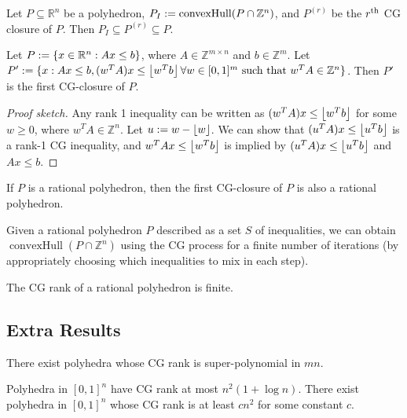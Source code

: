 \documentclass[a4paper,12pt,fleqn]{article}
\DeclareMathOperator{\convexHull}{convexHull}
\begin{document}
\begin{lemma}
Let $P \subseteq \mathbb{R}^n$ be a polyhedron,
$P_I \defeq \convexHull(P \cap \mathbb{Z}^n)$,
and $P^{(r)}$ be the $r^{\textrm{th}}$ CG closure of $P$.
Then $P_I \subseteq P^{(r)} \subseteq P$.
\end{lemma}

\begin{lemma}
Let $P := \{x \in \mathbb{R}^n: Ax \le b\}$,
where $A \in \mathbb{Z}^{m \times n}$ and $b \in \mathbb{Z}^m$.
Let $P' := \{x: Ax \le b, (w^TA)x \le \left\lfloor w^Tb \right\rfloor \forall w \in [0, 1]^m
\textrm{ such that } w^TA \in \mathbb{Z}^n\}$.
Then $P'$ is the first CG-closure of $P$.
\end{lemma}
\begin{proof}[Proof sketch]
Any rank 1 inequality can be written as $(w^TA)x \le \left\lfloor w^Tb \right\rfloor$ for some $w \ge 0$,
where $w^TA \in \mathbb{Z}^n$. Let $u := w - \left\lfloor w \right\rfloor$.
We can show that $(u^TA)x \le \left\lfloor u^Tb \right\rfloor$ is a rank-1 CG inequality,
and $w^TAx \le \left\lfloor w^Tb \right\rfloor$ is implied by $(u^TA)x \le \left\lfloor u^Tb \right\rfloor$ and $Ax \le b$.
\end{proof}

\begin{theorem}
If $P$ is a rational polyhedron, then the first CG-closure of $P$ is also a rational polyhedron.
\end{theorem}

\begin{theorem}
Given a rational polyhedron $P$ described as a set $S$ of inequalities,
we can obtain $\convexHull(P \cap \mathbb{Z}^n)$ using the CG process
for a finite number of iterations
(by appropriately choosing which inequalities to mix in each step).
\end{theorem}
\begin{corollary}
The CG rank of a rational polyhedron is finite.
\end{corollary}

\subsection{Extra Results}

\begin{theorem}
There exist polyhedra whose CG rank is super-polynomial in $mn$.
\end{theorem}

\begin{theorem}
Polyhedra in $[0, 1]^n$ have CG rank at most $n^2(1 + \log n)$.
There exist polyhedra in $[0, 1]^n$ whose CG rank is at least $cn^2$ for some constant $c$.
\end{theorem}
\end{document}
